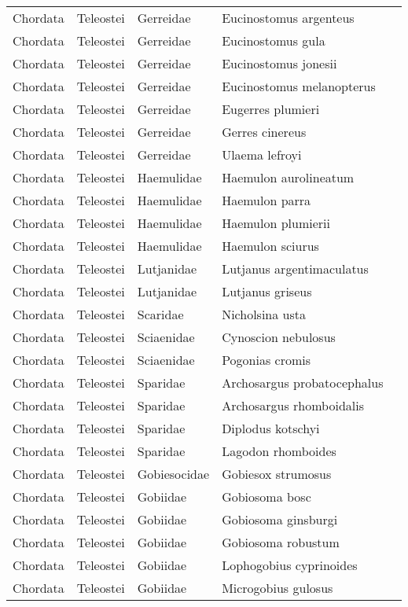 \begin{longtable}{lllll}
  Chordata & Teleostei & Gerreidae & Eucinostomus argenteus &  \\ 
  Chordata & Teleostei & Gerreidae & Eucinostomus gula &  \\ 
  Chordata & Teleostei & Gerreidae & Eucinostomus jonesii &  \\ 
  Chordata & Teleostei & Gerreidae & Eucinostomus melanopterus &  \\ 
  Chordata & Teleostei & Gerreidae & Eugerres plumieri &  \\ 
  Chordata & Teleostei & Gerreidae & Gerres cinereus &  \\ 
  Chordata & Teleostei & Gerreidae & Ulaema lefroyi &  \\ 
  Chordata & Teleostei & Haemulidae & Haemulon aurolineatum &  \\ 
  Chordata & Teleostei & Haemulidae & Haemulon parra &  \\ 
  Chordata & Teleostei & Haemulidae & Haemulon plumierii &  \\ 
  Chordata & Teleostei & Haemulidae & Haemulon sciurus &  \\ 
  Chordata & Teleostei & Lutjanidae & Lutjanus argentimaculatus &  \\ 
  Chordata & Teleostei & Lutjanidae & Lutjanus griseus &  \\ 
  Chordata & Teleostei & Scaridae & Nicholsina usta &  \\ 
  Chordata & Teleostei & Sciaenidae & Cynoscion nebulosus &  \\ 
  Chordata & Teleostei & Sciaenidae & Pogonias cromis &  \\ 
  Chordata & Teleostei & Sparidae & Archosargus probatocephalus &  \\ 
  Chordata & Teleostei & Sparidae & Archosargus rhomboidalis &  \\ 
  Chordata & Teleostei & Sparidae & Diplodus kotschyi &  \\ 
  Chordata & Teleostei & Sparidae & Lagodon rhomboides &  \\ 
  Chordata & Teleostei & Gobiesocidae & Gobiesox strumosus &  \\ 
  Chordata & Teleostei & Gobiidae & Gobiosoma bosc &  \\ 
  Chordata & Teleostei & Gobiidae & Gobiosoma ginsburgi &  \\ 
  Chordata & Teleostei & Gobiidae & Gobiosoma robustum &  \\ 
  Chordata & Teleostei & Gobiidae & Lophogobius cyprinoides &  \\ 
  Chordata & Teleostei & Gobiidae & Microgobius gulosus &  \\ 

\end{longtable}
